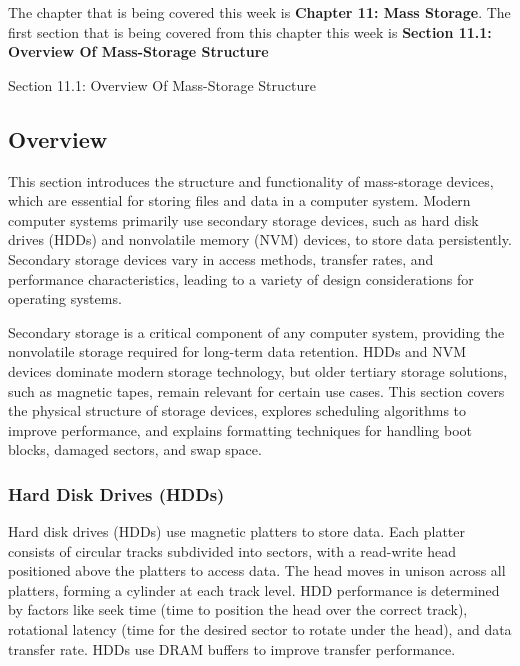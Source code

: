 The chapter that is being covered this week is \textbf{Chapter 11: Mass Storage}. The first section that is being covered from this chapter this week is \textbf{Section 11.1: Overview Of Mass-Storage Structure}

\begin{notes}{Section 11.1: Overview Of Mass-Storage Structure}
    
    \subsection*{Overview}
    
    This section introduces the structure and functionality of mass-storage devices, which are essential for storing files and data in a computer system. Modern computer systems primarily use secondary 
    storage devices, such as hard disk drives (HDDs) and nonvolatile memory (NVM) devices, to store data persistently. Secondary storage devices vary in access methods, transfer rates, and performance 
    characteristics, leading to a variety of design considerations for operating systems.
    
    Secondary storage is a critical component of any computer system, providing the nonvolatile storage required for long-term data retention. HDDs and NVM devices dominate modern storage technology, 
    but older tertiary storage solutions, such as magnetic tapes, remain relevant for certain use cases. This section covers the physical structure of storage devices, explores scheduling algorithms 
    to improve performance, and explains formatting techniques for handling boot blocks, damaged sectors, and swap space.

    \subsubsection*{Hard Disk Drives (HDDs)}
    
    Hard disk drives (HDDs) use magnetic platters to store data. Each platter consists of circular tracks subdivided into sectors, with a read-write head positioned above the platters to access data. The 
    head moves in unison across all platters, forming a cylinder at each track level. HDD performance is determined by factors like seek time (time to position the head over the correct track), rotational 
    latency (time for the desired sector to rotate under the head), and data transfer rate. HDDs use DRAM buffers to improve transfer performance.
    
    \begin{highlight}
    

\end{highlight}
\end{notes}
